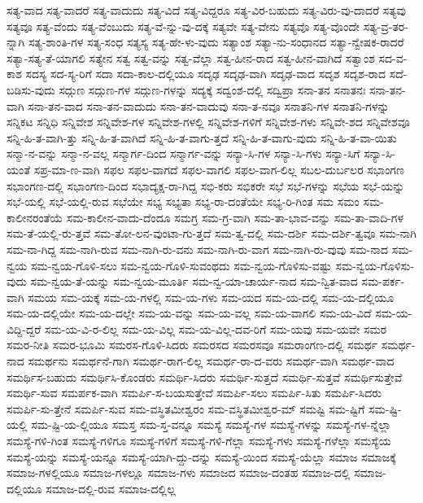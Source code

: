 {ಸತ್ಯ-ವಾದ
ಸತ್ಯ-ವಾದರೆ
ಸತ್ಯ-ವಾದುದು
ಸತ್ಯ-ವಿದೆ
ಸತ್ಯ-ವಿದ್ದರೂ
ಸತ್ಯ-ವಿರ-ಬಹುದು
ಸತ್ಯ-ವಿರು-ವು-ದಾದರೆ
ಸತ್ಯವು
ಸತ್ಯವೂ
ಸತ್ಯ-ವೆಂದು
ಸತ್ಯ-ವೆಂಬುದು
ಸತ್ಯ-ವೆ-ನ್ನು-ವು-ದಕ್ಕೆ
ಸತ್ಯವೇ
ಸತ್ಯ-ವೇನು
ಸತ್ಯವೊ
ಸತ್ಯ-ವೊಂದೇ
ಸತ್ಯ-ವ್ರ-ತರ-ನ್ನಾಗಿ
ಸತ್ಯ-ಶಾಂತಿ-ಗಳ
ಸತ್ಯ-ಸಂಧ
ಸತ್ಯಸ್ಯ
ಸತ್ಯ-ಹೇ-ಳು-ವುದು
ಸತ್ಯಾಂಶ
ಸತ್ಯಾ-ನು-ಸಂಧಾನದ
ಸತ್ಯಾ-ನ್ವೇಷಕ-ರಾದರೆ
ಸತ್ಯಾ-ಸತ್ಯ-ತೆ-ಯಾಗಲಿ
ಸತ್ಯೇನ
ಸತ್ವ
ಸತ್ವ-ವನ್ನು
ಸತ್ವ-ವೆಲ್ಲಾ
ಸತ್ವ-ಹೀನ-ರಾದ
ಸತ್ವ-ಹೀನ-ವಾಗಿದೆ
ಸತ್ವಾಂಶ
ಸದ-ವ-ಕಾಶ
ಸದಸ್ಯ
ಸದ-ಸ್ಯ-ರಿಗೆ
ಸದಾ
ಸದಾ-ಕಾಲ-ದಲ್ಲಿಯೂ
ಸದೃಢ
ಸದೃಢ-ವಾಗಿ
ಸದೃಢ-ವಾದ
ಸದೃಶ
ಸದೃಶ-ರಾದ
ಸದೆ-ಬಡಿಸು-ವುದು
ಸದ್ಗುಣ
ಸದ್ಗುಣ-ಗಳ
ಸದ್ಗುಣ-ಗಳನ್ನು
ಸದ್ಯಕ್ಕೆ
ಸದ್ವಂಶ-ದಲ್ಲಿ
ಸದ್ವಿಪ್ರಾ
ಸನಾ-ತನ
ಸನಾತನಃ
ಸನಾ-ತನ-ವಾಗಿ
ಸನಾ-ತನ-ವಾದ
ಸನಾ-ತನ-ವಾದುದು
ಸನಾ-ತನ-ವಾದುವು
ಸನಾ-ತ-ನವೂ
ಸನಾತನಿ-ಗಳ
ಸನಾತನಿ-ಗಳನ್ನು
ಸನ್ನಿಕಟ
ಸನ್ನಿಧಿ
ಸನ್ನಿವೇಶ
ಸನ್ನಿವೇಶ-ಗಳ
ಸನ್ನಿವೇಶ-ಗಳಲ್ಲಿ
ಸನ್ನಿವೇಶ-ಗಳಿಗೆ
ಸನ್ನಿವೇಶ-ಗಳು
ಸನ್ನಿವೇ-ಶದ
ಸನ್ನಿವೇಶವೂ
ಸನ್ನಿ-ಹಿ-ತ-ವಾಗಿ-ತ್ತು
ಸನ್ನಿ-ಹಿ-ತ-ವಾಗಿದೆ
ಸನ್ನಿ-ಹಿ-ತ-ವಾಗು-ತ್ತದೆ
ಸನ್ನಿ-ಹಿ-ತ-ವಾಗು-ವುದು
ಸನ್ನಿ-ಹಿ-ತ-ವಾ-ಯಿತು
ಸನ್ಮಾ-ನ-ವನ್ನು
ಸನ್ಮಾ-ನ-ವಲ್ಲ
ಸನ್ಮಾರ್ಗ-ದಿಂದ
ಸನ್ಮಾರ್ಗ-ವನ್ನು
ಸನ್ಯಾ-ಸಿ-ಗಳ
ಸನ್ಯಾ-ಸಿ-ಗಳು
ಸನ್ಯಾ-ಸಿಗೆ
ಸನ್ಯಾ-ಸಿ-ಯಂತೆ
ಸಪ್ರ-ಮಾ-ಣ-ವಾಗಿ
ಸಫಲ
ಸಫಲ-ವಾಗದೆ
ಸಫಲ-ವಾಗಲಿ
ಸಫಲ-ವಾಗ-ಲಿಲ್ಲ
ಸಬಲ-ದುರ್ಬಲರ
ಸಭಾಂಗಣ
ಸಭಾಂಗಣ-ದಲ್ಲಿ
ಸಭಾಂಗಣ-ದಿಂದ
ಸಭಾದ್ಯಕ್ಷ-ರಾ-ಗಿದ್ದ
ಸಭಿ-ಕರು
ಸಭಿಕರೇ
ಸಭೆ
ಸಭೆ-ಗಳನ್ನು
ಸಭೆಯ
ಸಭೆ-ಯನ್ನು
ಸಭೆ-ಯಲ್ಲಿ
ಸಭೆ-ಯಲ್ಲಿ-ರುವ
ಸಭೆಯೇ
ಸಭ್ಯ
ಸಭ್ಯತಾ
ಸಭ್ಯ-ರಾ-ದಂತೆಯೇ
ಸಭ್ಯ-ರಿ-ಗಿಂತ
ಸಮ
ಸಮಂ
ಸಮ-ಕಾಲೀನರಂತೆಯೆ
ಸಮ-ಕಾಲೀನ-ವಾದು-ದೆಂದೂ
ಸಮಗ್ರ
ಸಮ-ಗ್ರ-ವಾಗಿ
ಸಮ-ತಾ-ಭಾವ-ವನ್ನು
ಸಮ-ತಾ-ವಾದಿ-ಗಳ
ಸಮ-ತೆ-ಯಲ್ಲಿ-ರು-ತ್ತವೆ
ಸಮ-ತೋ-ಲನ-ವುಂಟಾ-ಗು-ತ್ತದೆ
ಸಮ-ತ್ವ-ದಲ್ಲಿ
ಸಮ-ದರ್ಶಿ
ಸಮ-ದರ್ಶಿ-ತ್ವವೂ
ಸಮ-ನಾಗಿ
ಸಮ-ನಾ-ಗಿದ್ದ
ಸಮ-ನಾಗಿ-ರುವ
ಸಮ-ನಾಗಿ-ರು-ವನು
ಸಮ-ನಾಗಿ-ರು-ವಾಗ
ಸಮ-ನಾಗಿ-ರು-ವುವು
ಸಮ-ನಾದ
ಸಮ-ನ್ವಯ
ಸಮ-ನ್ವಯ-ಗೊಳಿ-ಸಲು
ಸಮ-ನ್ವಯ-ಗೊಳಿ-ಸುವಂಥದು
ಸಮ-ನ್ವಯ-ಗೊಳಿಸು-ವಷ್ಟು
ಸಮ-ನ್ವಯ-ಗೊಳಿಸು-ವುದು
ಸಮ-ನ್ವಯ-ತೆ-ಯನ್ನು
ಸಮ-ನ್ವಯ-ಮೂರ್ತಿ
ಸಮ-ನ್ವ-ಯಾ-ಚಾರ್ಯ-ನಾದ
ಸಮ-ನ್ವಿತ-ವಾದ
ಸಮ-ಪರ್ಕ-ವಾಗಿ
ಸಮಯ
ಸಮ-ಯಕ್ಕೆ
ಸಮ-ಯ-ಗಳಲ್ಲಿ
ಸಮ-ಯ-ಗಳು
ಸಮ-ಯದ
ಸಮ-ಯ-ದಲ್ಲಿ
ಸಮ-ಯ-ದಲ್ಲಿಯೂ
ಸಮ-ಯ-ದಲ್ಲಿಯೇ
ಸಮ-ಯ-ದಲ್ಲೇ
ಸಮ-ಯ-ವನ್ನು
ಸಮ-ಯ-ವಲ್ಲ
ಸಮ-ಯ-ವಾಗಲಿ
ಸಮ-ಯ-ವಿದೆ
ಸಮ-ಯ-ವಿದ್ದಿ-ದ್ದರೆ
ಸಮ-ಯ-ವಿ-ರ-ಲಿಲ್ಲ
ಸಮ-ಯ-ವಿಲ್ಲ
ಸಮ-ಯ-ವಿಲ್ಲ-ದವ-ರಿಗೆ
ಸಮ-ಯವು
ಸಮ-ಯವೇ
ಸಮರ
ಸಮರ-ನೀತಿ
ಸಮರ-ಭೂಮಿ
ಸಮರಸ-ಗೊಳಿ-ಸಿದರು
ಸಮರಸದ
ಸಮರಸವೂ
ಸಮರಾಂಗಣ-ದಲ್ಲಿ
ಸಮರ್ಥ
ಸಮರ್ಥ-ನಾದ
ಸಮರ್ಥನು
ಸಮರ್ಥನೆ-ಗಾಗಿ
ಸಮರ್ಥ-ರಾಗ-ಲಿಲ್ಲ
ಸಮರ್ಥ-ರಾ-ದ-ವರು
ಸಮರ್ಥ-ವಾಗಿ
ಸಮರ್ಥ-ವಾದ
ಸಮರ್ಥಿಸ-ಬಹುದು
ಸಮರ್ಥಿಸಿ-ಕೊಂಡರು
ಸಮರ್ಥಿ-ಸಿದರು
ಸಮರ್ಥಿ-ಸುತ್ತದೆ
ಸಮರ್ಥಿ-ಸುತ್ತವೆ
ಸಮರ್ಥಿಸುತ್ತೇವೆ
ಸಮರ್ಥಿ-ಸುವ
ಸಮರ್ಪಕ-ವಾಗಿ
ಸಮರ್ಪಿ-ಸ-ಬಯಸುತ್ತೇವೆ
ಸಮರ್ಪಿ-ಸಲು
ಸಮರ್ಪಿ-ಸಿತು
ಸಮರ್ಪಿ-ಸಿದರು
ಸಮರ್ಪಿ-ಸು-ತ್ತೇನೆ
ಸಮರ್ಪಿ-ಸುವ
ಸಮ-ವಸ್ಥಿತಮೀಶ್ವರಂ
ಸಮ-ವಸ್ಥಿತಮೀಶ್ವರ-ಮ್
ಸಮಷ್ಟಿ
ಸಮ-ಷ್ಟಿಗೆ
ಸಮ-ಷ್ಟಿ-ಯಲ್ಲಿ
ಸಮ-ಷ್ಟಿ-ಯ-ಲ್ಲಿಯೂ
ಸಮಸ್ತ
ಸಮ-ಸ್ತ-ವನ್ನೂ
ಸಮಸ್ಯೆ
ಸಮಸ್ಯೆ-ಗಳ
ಸಮಸ್ಯೆ-ಗಳನ್ನು
ಸಮಸ್ಯೆ-ಗಳ-ನ್ನೆಲ್ಲಾ
ಸಮಸ್ಯೆ-ಗಳಿ-ಗಿಂತ
ಸಮಸ್ಯೆ-ಗಳಿಗೂ
ಸಮಸ್ಯೆ-ಗಳಿಗೆ
ಸಮಸ್ಯೆ-ಗಳಿ-ಗೆಲ್ಲಾ
ಸಮಸ್ಯೆ-ಗಳು
ಸಮಸ್ಯೆ-ಗಳೆಲ್ಲಾ
ಸಮಸ್ಯೆಯ
ಸಮಸ್ಯೆ-ಯನ್ನು
ಸಮಸ್ಯೆ-ಯನ್ನೂ
ಸಮಸ್ಯೆ-ಯಾಗಿ-ದ್ದು-ದನ್ನು
ಸಮಸ್ಯೆ-ಯಿಂದ
ಸಮಸ್ಯೆ-ಯೆಲ್ಲಾ
ಸಮಾಜ
ಸಮಾಜಕ್ಕೆ
ಸಮಾಜ-ಗಳಲ್ಲಿಯೂ
ಸಮಾಜ-ಗಳಲ್ಲೂ
ಸಮಾಜ-ಗಳು
ಸಮಾಜದ
ಸಮಾಜ-ದಂತಹ
ಸಮಾಜ-ದಲ್ಲಿ
ಸಮಾಜ-ದಲ್ಲಿಯೂ
ಸಮಾಜ-ದಲ್ಲಿ-ರುವ
ಸಮಾಜ-ದಲ್ಲಿಲ್ಲ
}
